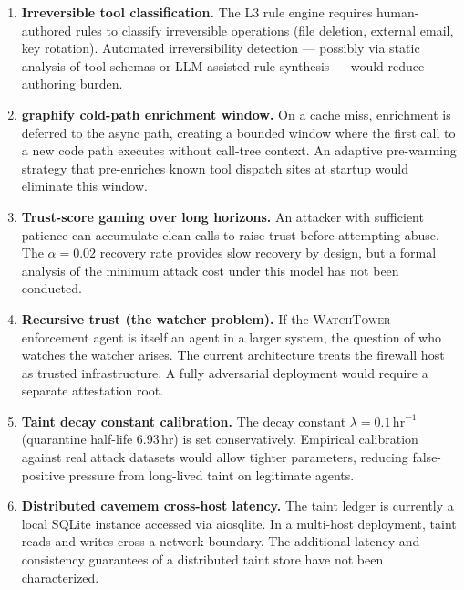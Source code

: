 \documentclass[conference]{IEEEtran}
\begin{document}
\begin{enumerate}

\item \textbf{Irreversible tool classification.}
The L3 rule engine requires human-authored rules to classify irreversible
operations (file deletion, external email, key rotation). Automated
irreversibility detection --- possibly via static analysis of tool schemas
or LLM-assisted rule synthesis --- would reduce authoring burden.

\item \textbf{graphify cold-path enrichment window.}
On a cache miss, enrichment is deferred to the async path, creating a
bounded window where the first call to a new code path executes without
call-tree context. An adaptive pre-warming strategy that pre-enriches
known tool dispatch sites at startup would eliminate this window.

\item \textbf{Trust-score gaming over long horizons.}
An attacker with sufficient patience can accumulate clean calls to raise
trust before attempting abuse. The $\alpha = 0.02$ recovery rate provides
slow recovery by design, but a formal analysis of the minimum attack cost
under this model has not been conducted.

\item \textbf{Recursive trust (the watcher problem).}
If the \textsc{WatchTower} enforcement agent is itself an agent in a
larger system, the question of who watches the watcher arises. The current
architecture treats the firewall host as trusted infrastructure. A fully
adversarial deployment would require a separate attestation root.

\item \textbf{Taint decay constant calibration.}
The decay constant $\lambda = 0.1\,\text{hr}^{-1}$ (quarantine half-life
6.93\,hr) is set conservatively. Empirical calibration against real attack
datasets would allow tighter parameters, reducing false-positive pressure
from long-lived taint on legitimate agents.

\item \textbf{Distributed cavemem cross-host latency.}
The taint ledger is currently a local SQLite instance accessed via
aiosqlite. In a multi-host deployment, taint reads and writes cross a
network boundary. The additional latency and consistency guarantees of a
distributed taint store have not been characterized.

\end{enumerate}
\end{document}
